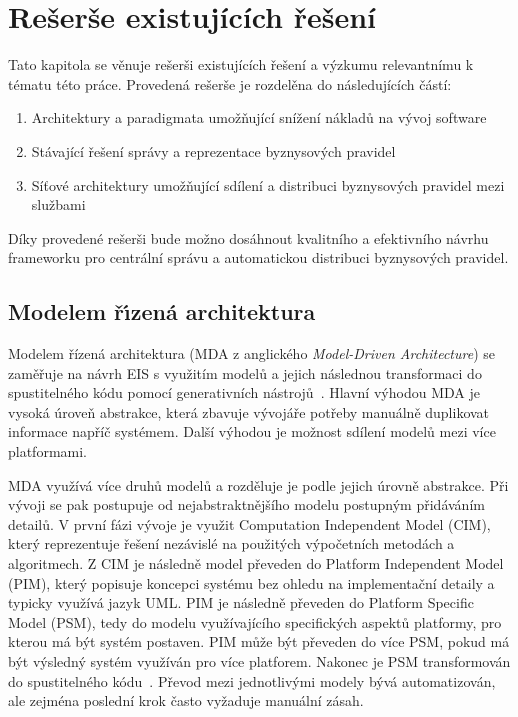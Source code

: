 
\chapter{Rešerše existujících řešení}\label{ch:reserse}

Tato kapitola se věnuje rešerši existujících řešení a výzkumu relevantnímu k tématu této práce.
Provedená rešerše je rozdelěna do následujících částí:

\begin{enumerate}
    \item Architektury a paradigmata umožňující snížení nákladů na vývoj software
    \item Stávající řešení správy a reprezentace byznysových pravidel
    \item Síťové architektury umožňující sdílení a distribuci byznysových pravidel mezi službami
\end{enumerate}

Díky provedené rešerši bude možno dosáhnout kvalitního a efektivního návrhu
frameworku pro centrální správu a automatickou distribuci byznysových pravidel.

\section{Modelem ř\'{\i}zená architektura}

Modelem řízená architektura (\gls{MDA} z anglického \textit{Model-Driven
Architecture}) se zaměřuje na návrh \gls{EIS} s využitím modelů a jejich
následnou transformaci do spustitelného kódu pomocí generativních nástrojů~\cite{soley2000model}.
Hlavní výhodou \gls{MDA} je vysoká úroveň abstrakce, která zbavuje vývojáře potřeby
manuálně duplikovat informace napříč systémem. Další výhodou je možnost sdílení modelů
mezi více platformami.

\gls{MDA} využívá více druhů modelů a rozděluje je podle jejich úrovně abstrakce.
Při vývoji se pak postupuje od nejabstraktnějšího modelu postupným přidáváním detailů.
V první fázi vývoje je využit Computation Independent Model (\gls{CIM}), který reprezentuje
řešení nezávislé na použitých výpočetních metodách a algoritmech. Z \gls{CIM} je
následně model převeden do Platform Independent Model (\gls{PIM}),
který popisuje koncepci systému bez ohledu na implementační detaily a typicky
využívá jazyk \gls{UML}. \gls{PIM} je následně převeden do
Platform Specific Model (\gls{PSM}), tedy do modelu využívajícího
specifických aspektů platformy, pro kterou má být systém postaven.
\gls{PIM} může být převeden do více \gls{PSM}, pokud má být výsledný systém využíván pro více platforem.
Nakonec je \gls{PSM} transformován do spustitelného kódu~\cite{kleppe2003model}.
Převod mezi jednotlivými modely bývá automatizován, ale zejména poslední krok
často vyžaduje manuální zásah.


